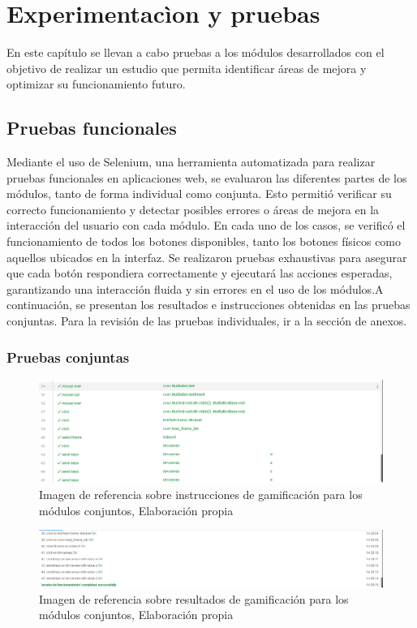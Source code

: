 \section{Experimentacìon y pruebas}
En este capítulo se llevan a cabo pruebas a los módulos desarrollados con el objetivo de realizar un estudio que permita identificar áreas de mejora y optimizar su funcionamiento futuro.
\subsection{Pruebas funcionales}
Mediante el uso de Selenium, una herramienta automatizada para realizar pruebas funcionales en aplicaciones web, se evaluaron las diferentes partes de los módulos, tanto de forma individual como conjunta. Esto permitió verificar su correcto funcionamiento y detectar posibles errores o áreas de mejora en la interacción del usuario con cada módulo.
En cada uno de los casos, se verificó el funcionamiento de todos los botones disponibles, tanto los botones físicos como aquellos ubicados en la interfaz. Se realizaron pruebas exhaustivas para asegurar que cada botón respondiera correctamente y ejecutará las acciones esperadas, garantizando una interacción fluida y sin errores en el uso de los módulos.A continuación, se presentan los resultados e instrucciones obtenidas en las pruebas conjuntas. Para la revisión de las pruebas individuales, ir a la sección de anexos.

\subsubsection{Pruebas conjuntas}

\begin{figure}[ht]
  \centering
  \includegraphics[width=1\linewidth]{Imagenes/Imagen11.png}
  \caption{Imagen de referencia sobre instrucciones de gamificación para los módulos conjuntos, Elaboración propia}
  \label{fig:imagen1pruebas}
\end{figure}
\begin{figure}[ht]
  \centering
  \includegraphics[width=1\linewidth]{Imagenes/Imagen12.png}
  \caption{Imagen de referencia sobre resultados de gamificación para los módulos conjuntos, Elaboración propia}
  \label{fig:imagen2pruebas}
\end{figure}

